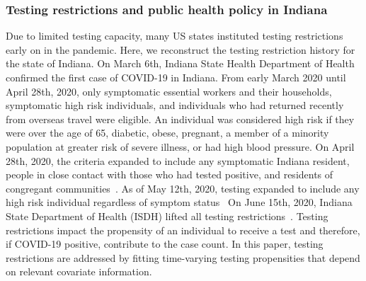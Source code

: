 \documentclass[11pt]{amsart}
\numberwithin{equation}{section}
\theoremstyle{plain}
\begin{document}

 \subsubsection{Testing restrictions and public health policy in Indiana}
 \label{section:publicpolicyindiana}

 Due to limited testing capacity, many US states instituted testing restrictions early on in the pandemic.
 Here, we reconstruct the testing restriction history for the state of Indiana.
 On March 6th, Indiana State Health Department of Health confirmed the first case of COVID-19 in Indiana.  From early March 2020 until April 28th, 2020, only symptomatic essential workers and their households, symptomatic high risk individuals, and individuals who had returned recently from overseas travel were eligible.  An individual was considered high risk if they were over the age of 65, diabetic, obese, pregnant, a member of a minority population at greater risk of severe illness, or had high blood pressure.
 On April 28th, 2020, the criteria expanded to include any symptomatic Indiana resident, people in close contact with those who had tested positive, and residents of congregant communities~\citep{wishtv2020}.
 As of May 12th, 2020, testing expanded to include any high risk individual regardless of symptom status~\citep{indystar2020}
 On June 15th, 2020, Indiana State Department of Health (ISDH) lifted all testing restrictions~\citep{indystar2020v2}.
 Testing restrictions impact the propensity of an individual to receive a test and therefore, if COVID-19 positive, contribute to the case count.  In this paper, testing restrictions are addressed by fitting time-varying testing propensities that depend on relevant covariate information.
\end{document}
